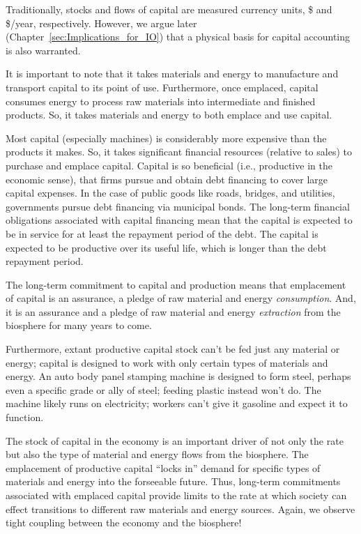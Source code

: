 Traditionally, stocks and flows of capital are measured currency units, 
\$ and \$/year, respectively.
However, we argue later (Chapter~\ref{sec:Implications_for_IO})
that a physical basis for capital accounting is also warranted.

It is important to note that it takes materials and energy
to manufacture and transport capital to its point of use.
Furthermore, once emplaced,
capital consumes energy to process raw materials 
into intermediate and finished products. 
So, it takes materials and energy to both emplace and use capital.

Most capital (especially machines) is considerably more expensive
than the products it makes.
So, it takes significant financial resources (relative to sales) 
to purchase and emplace capital.
Capital is so beneficial (i.e., productive in the economic sense), 
that firms pursue and obtain debt financing to cover large capital expenses.
In the case of public goods like roads, bridges, and utilities,
governments pursue debt financing via municipal bonds.
The long-term financial obligations associated with capital financing 
mean that the capital is expected to be in service
for at least the repayment period of the debt.
The capital is expected to be productive over its useful life,
which is longer than the debt repayment period.

The long-term commitment to capital and production means that 
emplacement of capital is an assurance, a pledge of 
raw material and energy \emph{consumption}.
And, it is an assurance and a pledge of raw material and energy \emph{extraction} 
from the biosphere for many years to come.

Furthermore, extant productive capital stock can't be fed just any material or energy;
capital is designed to work with only certain types of materials and energy.
An auto body panel stamping machine is designed to form steel, perhaps even a specific 
grade or ally of steel;
feeding plastic instead won't do.
The machine likely runs on electricity; 
workers can't give it gasoline and expect it to function.

The stock of capital in the economy 
is an important driver of not only 
the rate but also  
the type of
material and energy flows from the biosphere.
The emplacement of productive capital
``locks in'' demand for specific types of materials and energy 
into the forseeable future.
Thus, long-term commitments associated with emplaced capital
provide limits to the rate at which society can effect
transitions to different raw materials and energy sources.
Again, we observe tight coupling between the economy and the biosphere!

